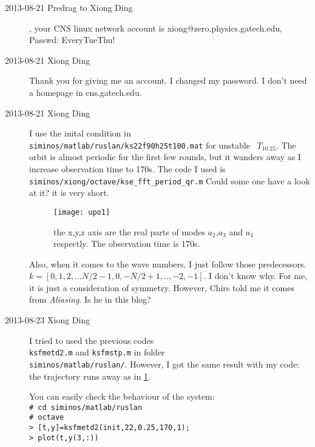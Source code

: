 \begin{description}
\item[2013-08-21 Predrag to Xiong Ding], your CNS linux network account is
xiong@zero.physics.gatech.edu,
Passwd: EveryTueThu!

\item[2013-08-21 Xiong Ding]
Thank you for giving me an account. I changed my password. I don't
need a homepage in cns.gatech.edu.

\item[2013-08-21 Xiong Ding]
I use the inital condition in\\
\texttt{siminos/matlab/ruslan/ks22f90h25t100.mat}
for unstable \po\ $T_{10.25}$. The orbit is almost periodic for the
first few rounds, but it wanders away as I increase observation time to 170s.
The code I used is\\
\texttt{siminos/xiong/octave/kse\_fft\_period\_qr.m}
Could some one have a look at it? it is very short.

\begin{figure}[h]
 \centering
 \texttt{[image: upo1]}
 \caption{the x,y,z axis are the real parts of modes  $a_2$,$a_3$ and $a_4$ respectly. The
 observation time is 170s.}
 \label{xiongupo1}
\end{figure}

Also, when it comes to the wave numbers, I just follow those predecessors.
$k=[0,1,2,...N/2-1,0,-N/2+1,..,-2,-1]$. I don't know why. For me, it
is just a consideration of symmetry. However, Chirs told me it comes from
\textit{Aliasing}. Is he in this blog?

\item[2013-08-23 Xiong Ding]
I tried to used the previous codes\\
\texttt{ksfmetd2.m} and \texttt{ksfmstp.m} in folder \\
\texttt{siminos/matlab/ruslan/}.
However, I got the same result with my code: the trajectory runs away as
in \ref{xiongupo1}.

You can easily check the behaviour of the system:\\
\texttt{\# cd siminos/matlab/ruslan}\\
\texttt{\# octave}\\
\texttt{> [t,y]=ksfmetd2(init,22,0.25,170,1);}\\
\texttt{> plot(t,y(3,:))}\\


\end{description}
